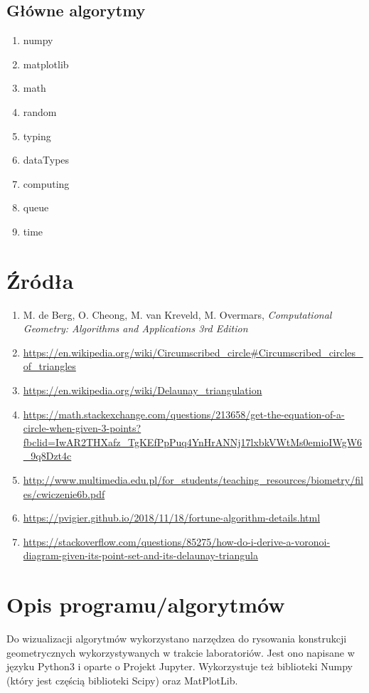 \documentclass{article}
\begin{document}
\subsection{Główne algorytmy}
\begin{enumerate}
    \item numpy
    \item matplotlib
    \item math
    \item random
    \item typing
    \item dataTypes
    \item computing 
    \item queue
    \item time
    
\end{enumerate}

\section{Źródła}
\begin{enumerate}
    \item M. de Berg, O. Cheong, M. van Kreveld, M. Overmars, \textit{Computational Geometry: Algorithms and Applications 3rd Edition}
    \item \url{https://en.wikipedia.org/wiki/Circumscribed_circle#Circumscribed_circles_of_triangles}

    \item \url{https://en.wikipedia.org/wiki/Delaunay_triangulation}

    \item \url{https://math.stackexchange.com/questions/213658/get-the-equation-of-a-circle-when-given-3-points?fbclid=IwAR2THXafz_TgKEfPpPuq4YnHrANNj17lxbkVWtMs0emioIWgW6_9q8Dzt4c}
    
    \item \url{http://www.multimedia.edu.pl/for_students/teaching_resources/biometry/files/cwiczenie6b.pdf}
    
    \item \url{https://pvigier.github.io/2018/11/18/fortune-algorithm-details.html}
    \item \url{https://stackoverflow.com/questions/85275/how-do-i-derive-a-voronoi-diagram-given-its-point-set-and-its-delaunay-triangula}
\end{enumerate}

\section{Opis programu/algorytmów}
Do wizualizacji algorytmów wykorzystano narzędzea do rysowania konstrukcji geometrycznych wykorzystywanych w trakcie laboratoriów. Jest ono napisane w języku Python3 i oparte o Projekt Jupyter. Wykorzystuje też biblioteki Numpy (który jest częścią biblioteki Scipy) oraz MatPlotLib.
\end{document}
